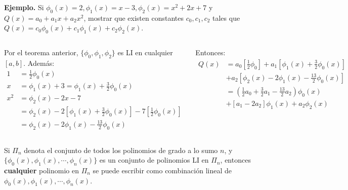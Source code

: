 \documentclass[9pt, aspectratio=169]{beamer}
\begin{document}
\begin{frame}
  \textbf{Ejemplo.} Si $\phi_0(x) = 2, \phi_1(x) = x-3, \phi_2(x) = x^2 + 2x+7$ y $Q(x) = a_0 + a_1 x + a_2 x^2$, mostrar que existen constantes $c_0, c_1, c_2$ tales que $Q(x) = c_0 \phi_0(x) + c_1 \phi_1(x) + c_2 \phi_2(x)$.
  \vspace{1em} \pause

  \begin{columns}[t]
    \cx
    Por el teorema anterior, $\{\phi_0, \phi_1, \phi_2 \}$ es LI en cualquier $[a, b]$. Además:
    \begin{align*}
      1   & = \frac{1}{2}\phi_0(x)                                                                                    \\
      x   & = \phi_1(x) + 3 = \phi_1(x) + \frac{3}{2} \phi_0(x)                                                       \\
      x^2 & = \phi_2(x) - 2 x - 7                                                                                     \\
          & = \phi_2(x) - 2 \left[ \phi_1(x) + \frac{3}{2} \phi_0(x) \right] - 7 \left[ \frac{1}{2} \phi_0(x) \right] \\
          & = \phi_2(x) -2 \phi_1(x) - \frac{13}{2} \phi_0(x)
    \end{align*} \pause

    \cx
    Entonces:
    \begin{align*}
      Q(x) & = a_0 \left[ \frac{1}{2} \phi_0 \right] + a_1 \left[ \phi_1(x) + \frac{3}{2} \phi_0(x)  \right] \\
           & + a_2 \left[ \phi_2(x) - 2\phi_1(x) - \frac{13}{2} \phi_0(x) \right]                            \\
           & = \left( \frac{1}{2} a_0 + \frac{3}{2} a_1 - \frac{13}{2} a_2 \right) \phi_0(x)                 \\
           & + [a_1 - 2 a_2] \phi_1(x) + a_2 \phi_2(x)
    \end{align*}
  \end{columns} \pause

  \begin{theorem}[]
    Si $\Pi_n$ denota el conjunto de todos los polinomios de grado a lo sumo $n$, y $\{\phi_0(x), \phi_1(x), \cdots, \phi_n(x) \}$ es un conjunto de polinomios LI en $\Pi_n$, entonces \textbf{cualquier} polinomio en $\Pi_n$ se puede escribir como combinación lineal de $\phi_0(x), \phi_1(x), \cdots, \phi_n(x)$.
  \end{theorem}

\end{frame}
\end{document}

